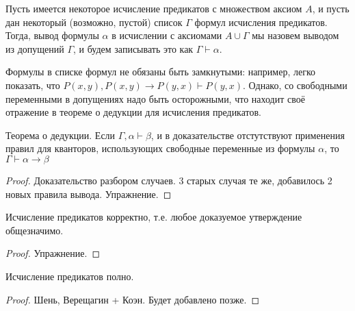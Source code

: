 \begin{definition}Пусть имеется некоторое исчисление предикатов с множеством
аксиом $A$, и пусть дан некоторый (возможно, пустой) список $\Gamma$ 
формул исчисления предикатов. Тогда, вывод формулы $\alpha$
в исчислении с аксиомами $A \cup \Gamma$ мы назовем выводом из 
допущений $\Gamma$, и будем записывать это как $\Gamma \vdash \alpha$.
\end{definition}

Формулы в списке формул не обязаны быть замкнутыми: например, легко 
показать, что $P(x,y), P(x,y)\rightarrow P(y,x) \vdash P(y,x)$. Однако,
со свободными переменными в допущениях надо быть осторожными, что 
находит своё отражение в теореме о дедукции для исчисления предикатов.

\begin{theorem}
Теорема о дедукции. Если $\Gamma, \alpha \vdash \beta$, 
и в доказательстве отстутствуют применения правил для кванторов, использующих
свободные переменные из формулы $\alpha$, то $\Gamma \vdash \alpha \rightarrow \beta$
\end{theorem}

\begin{proof}
Доказательство разбором случаев. 3 старых случая те же, добавилось 
2 новых правила вывода. Упражнение.
\end{proof}

\begin{theorem}
Исчисление предикатов корректно, т.е. любое доказуемое утверждение общезначимо.
\end{theorem}

\begin{proof}Упражнение.\end{proof}

\begin{theorem}
Исчисление предикатов полно.
\end{theorem}

\begin{proof}
Шень, Верещагин + Коэн. Будет добавлено позже.
\end{proof}
